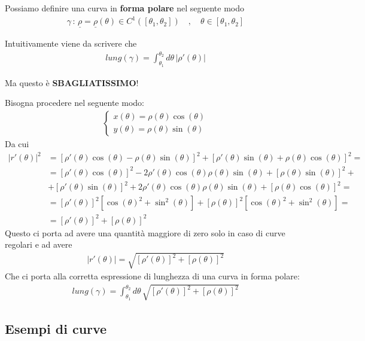 Possiamo definire una curva in \textbf{forma polare} nel seguente modo
\begin{align}
\gamma \, : \, \underline{\rho}=\underline{\rho}(\theta)\in C^1([\theta_1,\theta_2]) \quad , \quad \theta \in [\theta_1,\theta_2]
\end{align}

Intuitivamente viene da scrivere che
\begin{align}
lung(\gamma)= \int_{\theta_1}^{\theta_2} d\theta \, |\rho'(\theta)|
\end{align}

Ma questo è \textbf{SBAGLIATISSIMO}!

\newpage

Bisogna procedere nel seguente modo:
\begin{align}
\left\{
\begin{array}{cc}
x(\theta)=\rho(\theta) \cos(\theta)\\
y(\theta)=\rho(\theta) \sin(\theta)
\end{array}
\right.
\end{align}
Da cui
\begin{align}
|r'(\theta)|^2{}&= [ \rho'(\theta) \cos(\theta) - \rho(\theta) \sin(\theta) ]^2+ [\rho'(\theta) \sin(\theta) + \rho(\theta) \cos(\theta)]^2 = \nonumber \\
&= [\rho'(\theta) \cos(\theta)]^2 - 2\rho'(\theta) \cos(\theta) \rho(\theta) \sin(\theta) + [\rho(\theta) \sin(\theta) ]^2 + \nonumber \\
&+ [\rho'(\theta) \sin(\theta)]^2 + 2\rho'(\theta) \cos(\theta) \rho(\theta) \sin(\theta) + [\rho(\theta) \cos(\theta) ]^2 = \nonumber \\
&= [\rho'(\theta)]^2 [\cos(\theta)^2 + \sin^2(\theta)] + [\rho(\theta)]^2 [\cos(\theta)^2 + \sin^2(\theta)] = \nonumber \\
&= [\rho'(\theta)]^2 + [\rho(\theta)]^2
\end{align}
Questo ci porta ad avere una quantità maggiore di zero solo in caso di curve regolari e ad avere
\begin{align}
|r'(\theta)| = \sqrt{[\rho'(\theta)]^2 + [\rho(\theta)]^2}
\end{align}
Che ci porta alla corretta espressione di lunghezza di una curva in forma polare:
\begin{align}
lung(\gamma)= \int_{\theta_1}^{\theta_2} d\theta \, \sqrt{[\rho'(\theta)]^2 + [\rho(\theta)]^2}
\end{align}

\subsection{Esempi di curve}

